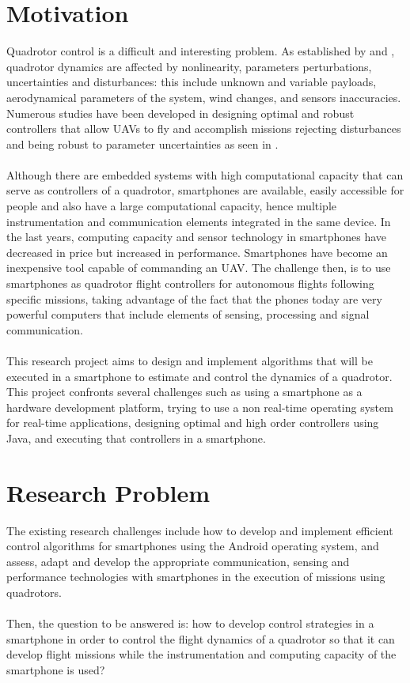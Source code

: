 \section{Motivation}
Quadrotor control is a difficult and interesting problem. As established by \cite{Liu2015} and \cite{Lopez2015}, quadrotor dynamics are affected by nonlinearity, parameters perturbations, uncertainties and disturbances: this include unknown and variable payloads, aerodynamical parameters of the system, wind changes, and sensors inaccuracies. Numerous studies have been developed in designing optimal and robust controllers that allow UAVs to fly and accomplish missions rejecting disturbances and being robust to parameter uncertainties as seen in \cite{Jung2014, Kohno2014, Shang2016, Salazar2014}.\\\\
Although there are embedded systems with high computational capacity that can serve as controllers of a quadrotor, smartphones are available, easily accessible for people and also have a large computational capacity, hence multiple instrumentation and communication elements integrated in the same device. In the last years, computing capacity and sensor technology in smartphones have decreased in price but increased in performance. Smartphones have become an inexpensive tool capable of commanding an UAV. The challenge then, is to use smartphones as quadrotor flight controllers for autonomous flights following specific missions, taking advantage of the fact that the phones today are very powerful computers that include elements of sensing, processing and signal communication.
\\\\
This research project aims to design and implement algorithms that will be executed in a smartphone to estimate and control the dynamics of a quadrotor. This project confronts several challenges such as using a smartphone as a hardware development platform, trying to use a non real-time operating system for real-time applications, designing optimal and high order controllers using Java, and executing that controllers in a smartphone. 

\section{Research Problem}
The existing research challenges include how to develop and implement efficient control algorithms for smartphones using the Android operating system, and assess, adapt and develop the appropriate communication, sensing and performance technologies with smartphones in the execution of missions using quadrotors.
\\\\
Then, the question to be answered is: how to develop control strategies in a smartphone in order to control the flight dynamics of a quadrotor so that it can develop flight missions while the instrumentation and computing capacity of the smartphone is used?
